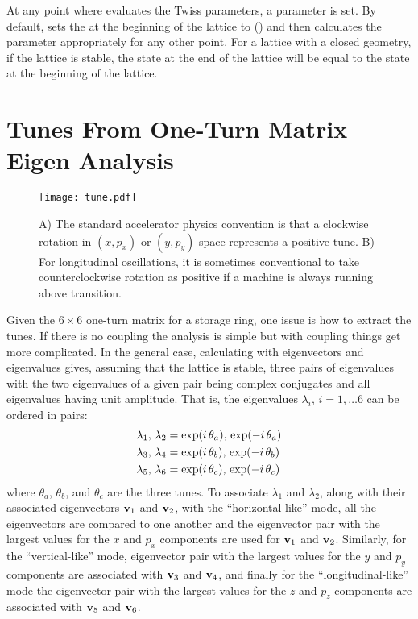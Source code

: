 At any point where \bmad evaluates the Twiss parameters, a  parameter is set. By
default, \bmad sets the  at the beginning of the lattice to 
() and then calculates the  parameter appropriately for any other
point. For a lattice with a closed geometry, if the lattice is stable, the  state at
the end of the lattice will be equal to the state at the beginning of the lattice.

\section{Tunes From One-Turn Matrix Eigen Analysis}
\label{s:eigen.tune}

\begin{figure}[tb]
  \centering
  \texttt{[image: tune.pdf]}
  \caption[Illustration of a positive tune]{A) The standard accelerator physics convention is that 
a clockwise rotation in $(x, p_x)$ or $(y, p_y)$ space represents a positive tune. B) For longitudinal
oscillations, it is sometimes conventional to take counterclockwise rotation as positive if a machine
is always running above transition.}
  \label{f:tune}
\end{figure}

Given the $6 \times 6$ one-turn matrix for a storage ring, one issue is how to extract the tunes. If
there is no coupling the analysis is simple but with coupling things get more complicated. In the
general case, calculating with eigenvectors and eigenvalues gives, assuming that the lattice is
stable, three pairs of eigenvalues with the two eigenvalues of a given pair being complex
conjugates and all eigenvalues having unit amplitude. That is, the eigenvalues $\lambda_i$, $i =
1, \ldots 6$ can be ordered in pairs:
\begin{align}
  \lambda_1, \, \lambda_2 &= \exp(i \, \theta_a), \, \exp(-i \, \theta_a) \nonumber \\
  \lambda_3, \, \lambda_4 &= \exp(i \, \theta_b), \, \exp(-i \, \theta_b) \label{lleit} \\
  \lambda_5, \, \lambda_6 &= \exp(i \, \theta_c), \, \exp(-i \, \theta_c) \nonumber
\end{align}
where $\theta_a$, $\theta_b$, and $\theta_c$ are the three tunes. To associate $\lambda_1$ and
$\lambda_2$, along with their associated eigenvectors ${\bf v}_1$ and ${\bf v}_2$, with the
``horizontal-like'' mode, all the eigenvectors are compared to one another and the eigenvector pair
with the largest values for the $x$ and $p_x$ components are used for ${\bf v}_1$ and ${\bf v}_2$.
Similarly, for the ``vertical-like'' mode, eigenvector pair with the largest values for the $y$ and
$p_y$ components are associated with ${\bf v}_3$ and ${\bf v}_4$, and finally for the ``longitudinal-like''
mode the eigenvector pair with the largest values for the $z$ and $p_z$ components are associated
with ${\bf v}_5$ and ${\bf v}_6$.

